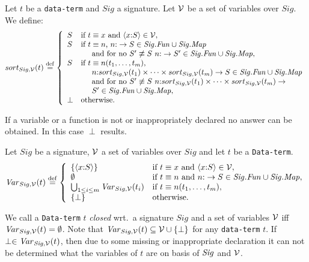 \documentclass[twoside,fleqn,a4paper,dvips]{article}
\newcommand{\Sig}{\nm{Sig}}
\newcommand{\Fun}{\nm{Fun}}
\newcommand{\wor}{\stackrel{\mathrm{def}}{=}}
\newcommand{\NV}{{\cal V}}
\begin{document}
\begin{defn}
Let $t$ be a {\tt data-term} and $Sig$ a signature. Let $\NV$ be a set
of variables over $Sig$. We define:
\[sort_{Sig,\NV}(t)\wor\left\{
\begin{array}{ll}
S&\mbox{if~}t\equiv x\mbox{ and }\langle x\ap S\rangle \in \NV,\\
S&\mbox{if $t\equiv n$, $n\ap \rightarrow S\in
\Sig.\Fun\cup\Sig.\Map$}\\
&\hspace*{0.5cm}\mbox{and for no $S'\not\equiv S$}~n\ap \rightarrow
S'\in\Sig.\Fun\cup\Sig.\Map,\\
S&\mbox{if $t\equiv n(t_1,\ldots,t_m)$,}\\
&\mbox{$\hspace{0.5cm}n\ap sort_{Sig,\NV}(t_1)\times \cdots
\times sort_{Sig,\NV}(t_m)\rightarrow S \in \Sig.\Fun\cup\Sig.\Map$}\\
&\hspace{0.5cm}\mbox{and for
no}~S'\not\equiv S~n\ap sort_{Sig,\NV}(t_1)\times \cdots
\times sort_{Sig,\NV}(t_m)\rightarrow\\
&\hspace*{0.5cm}S' \in \Sig.\Fun\cup\Sig.\Map,\\
\perp&\mbox{otherwise}.
\end{array}\right.\]
\end{defn}
If a variable or a function is not or inappropriately declared 
no answer can be obtained. In this case $\perp$ results.
\begin{defn}
Let $Sig$ be a signature, $\NV$ a set of
variables over $Sig$ and let $t$ be a {\tt Data-term}.
\[\Var_{Sig,\NV}(t)\wor
\left\{
\begin{array}{ll}
\{\langle x\ap S\rangle\}&\mbox{if }t\equiv x\mbox{ and }\langle
x\ap S\rangle\in \NV,\\
\emptyset&\mbox{if~}t\equiv n\mbox{ and }n\ap \rightarrow S\in
\Sig.\Fun\cup\Sig.\Map,\\
\bigcup_{1\leq i\leq m} \Var_{Sig,\NV}(t_i)&\mbox{if~}t\equiv 
n(t_1,\ldots,t_m),\\
\{\perp\}&\mbox{otherwise}.
\end{array}\right.\]
\end{defn}
We call a {\tt Data-term} $t$ {\em closed} wrt.\ a signature
$Sig$ and a set of variables $\NV$ iff $\Var_{Sig,\NV}(t)=
\emptyset$. Note that $\Var_{Sig,\NV}(t)\subseteq\NV\cup\{\perp\}$
for any {\tt data-term} $t$. If $\perp\in \Var_{\Sig,\NV}(t)$, then
due  to some missing or inappropriate declaration 
it can not be determined what the variables of $t$ are on basis of
$\Sig$ and $\NV$.
\end{document}
